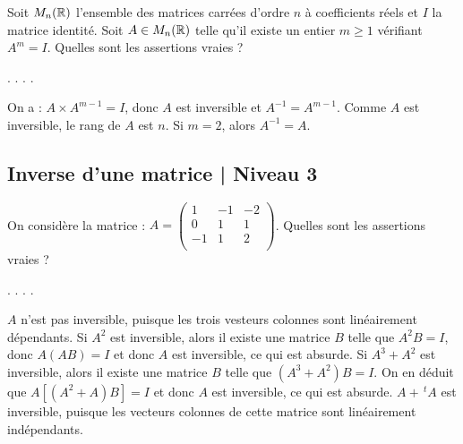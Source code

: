 \begin{question}
Soit $ M_n(\mathbb{R})$ l'ensemble des matrices carrées d'ordre $n$ à coefficients réels et $I$ la matrice identité. Soit $A \in M_n(\mathbb{R})$ telle qu'il existe un entier $m\ge 1$ vérifiant $A^m = I$. Quelles sont les assertions vraies ?
\begin{answers}  
.
.
.
.
\end{answers}
\begin{explanations} On a : $A \times A^{m-1} = I$, donc $A$ est inversible et $A^{-1} = A^{m-1}$. Comme $A$ est inversible, le rang de $A$ est $n$. Si $m=2$, alors $A^{-1}=A$.
\end{explanations}
\end{question}

\subsection{Inverse d'une matrice | Niveau 3}

\begin{question}
On considère la matrice : $A = \left(\begin{array}{rcc}
1&-1&-2\\0&1&1\\ -1&1&2\\ \end{array}\right)$. Quelles sont les assertions vraies ?
\begin{answers}  
.
.
.
.
\end{answers}
\begin{explanations} $A$ n'est pas inversible, puisque les trois vesteurs colonnes sont linéairement dépendants.
\vskip0mm
Si $A^2$ est inversible, alors il existe une matrice  $B$ telle que $A^2B=I$, donc $A(AB)=I$ et donc $A$ est inversible,
ce qui est absurde.
\vskip0mm
Si $A^3+A^2$ est inversible, alors il existe une matrice $B$ telle que $(A^3+A^2)B=I$. On en déduit que $A[(A^2+A)B]=I$ et donc $A$ est inversible, ce qui est absurde.
\vskip0mm
$A+\, ^tA$ est inversible, puisque les vecteurs colonnes de cette matrice sont linéairement indépendants.
\end{explanations}
\end{question}

